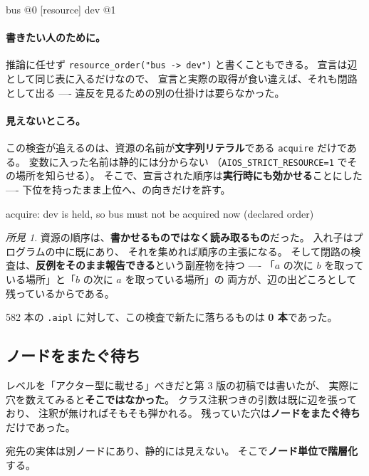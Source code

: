 \documentclass[11pt,a4paper]{ltjsarticle}
\theoremstyle{definition}
\theoremstyle{remark}
\newtheorem{finding}[theorem]{所見}
\begin{document}
\begin{term}
[resource] bus                  @0
[resource] dev                  @1
\end{term}

\paragraph{書きたい人のために。}
推論に任せず \texttt{resource\_order("bus -> dev")} と書くこともできる。
宣言は辺として同じ表に入るだけなので、
宣言と実際の取得が食い違えば、それも閉路として出る ----
違反を見るための別の仕掛けは要らなかった。

\paragraph{見えないところ。}
この検査が追えるのは、資源の名前が\textbf{文字列リテラル}である
\texttt{acquire} だけである。
変数に入った名前は静的には分からない
（\texttt{AIOS\_STRICT\_RESOURCE=1} でその場所を知らせる）。
そこで、宣言された順序は\textbf{実行時にも効かせる}ことにした ----
下位を持ったまま上位へ、の向きだけを許す。

\begin{term}
acquire: dev is held, so bus must not be acquired now (declared order)
\end{term}

\begin{finding}
資源の順序は、\textbf{書かせるものではなく読み取るもの}だった。
入れ子はプログラムの中に既にあり、
それを集めれば順序の主張になる。
そして閉路の検査は、\textbf{反例をそのまま報告できる}という副産物を持つ ----
「$a$ の次に $b$ を取っている場所」と「$b$ の次に $a$ を取っている場所」の
両方が、辺の出どころとして残っているからである。

582 本の \texttt{.aipl} に対して、この検査で新たに落ちるものは
\textbf{0 本}であった。
\end{finding}

\subsection{ノードをまたぐ待ち}
\label{sec:nodelevel}

レベルを「アクター型に載せる」べきだと第 3 版の初稿では書いたが、
実際に穴を数えてみると\textbf{そこではなかった}。
クラス注釈つきの引数は既に辺を張っており、
注釈が無ければそもそも弾かれる。
残っていた穴は\textbf{ノードをまたぐ待ち}だけであった。

宛先の実体は別ノードにあり、静的には見えない。
そこで\textbf{ノード単位で階層化}する。
\end{document}
